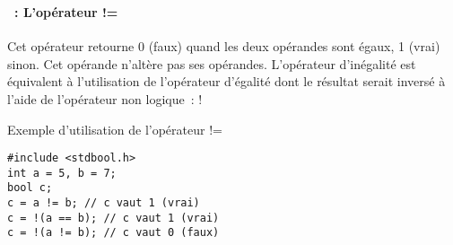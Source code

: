 \begin{frame}[containsverbatim]
  \frametitle{\secname}
  \framesubtitle{\subsecname~: L'opérateur !=} 

  Cet opérateur retourne 0 (faux) quand les deux opérandes sont égaux, 1 (vrai) sinon. Cet opérande n'altère pas ses opérandes.
  \vspace{0.3cm}
  L'opérateur d'inégalité est équivalent à l'utilisation de l'opérateur d'égalité dont le résultat serait inversé à l'aide de l'opérateur
  non logique~: !
  \vspace{0.3cm}
  \begin{exampleblock}{Exemple d'utilisation de l'opérateur !=}
    \begin{verbatim}
#include <stdbool.h>
int a = 5, b = 7;
bool c;
c = a != b; // c vaut 1 (vrai)
c = !(a == b); // c vaut 1 (vrai)
c = !(a != b); // c vaut 0 (faux)\end{verbatim}
  \end{exampleblock}
\end{frame}


